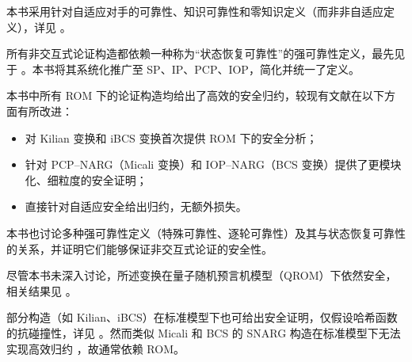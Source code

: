 \documentclass[american,singlepageview]{snargs-book-zh}
\begin{document}
本书采用针对自适应对手的可靠性、知识可靠性和零知识定义（而非非自适应定义），详见 。

所有非交互式论证构造都依赖一种称为“状态恢复可靠性”的强可靠性定义，最先见于 \cite{BenSassonCS16}。本书将其系统化推广至 SP、IP、PCP、IOP，简化并统一了定义。

本书中所有 ROM 下的论证构造均给出了高效的安全归约，较现有文献在以下方面有所改进：
\begin{itemize}[nolistsep]
  \item 对 Kilian 变换和 iBCS 变换首次提供 ROM 下的安全分析；
  \item 针对 PCP–NARG（Micali 变换）和 IOP–NARG（BCS 变换）提供了更模块化、细粒度的安全证明；
  \item 直接针对自适应安全给出归约，无额外损失。
\end{itemize}

本书也讨论多种强可靠性定义（特殊可靠性、逐轮可靠性）及其与状态恢复可靠性的关系，并证明它们能够保证非交互式论证的安全性。

尽管本书未深入讨论，所述变换在量子随机预言机模型（QROM）下依然安全，相关结果见 \cite{BonehDFLSZ11,DonFMS19,LiuZ19,ChiesaMS19}。

部分构造（如 Kilian、iBCS）在标准模型下也可给出安全证明，仅假设哈希函数的抗碰撞性，详见 \cite{Kilian92,BarakG08,IshaiMSX15,ChiesaDGS24}。然而类似 Micali 和 BCS 的 SNARG 构造在标准模型下无法实现高效归约 \cite{GentryW11}，故通常依赖 ROM。

\cleardoublepage



\printbibliography
\end{document}
